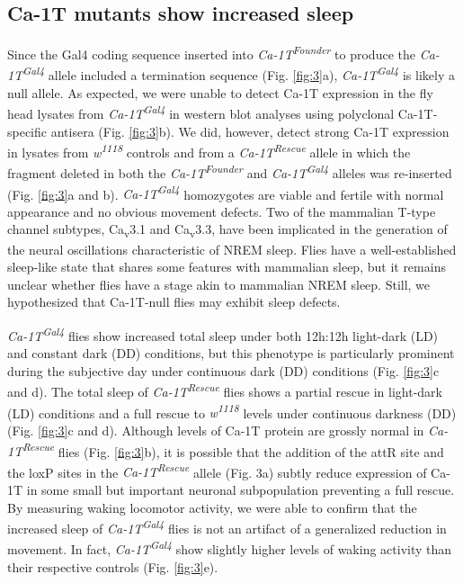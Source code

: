 \subsection*{Ca-\alpha1T mutants show increased sleep}

Since the Gal4 coding sequence inserted into \emph{Ca-\alpha1T\textsuperscript{Founder}} to produce the \emph{Ca-\alpha1T\textsuperscript{Gal4}} allele included a termination sequence (Fig. \ref{fig:3}a), \emph{Ca-\alpha1T\textsuperscript{Gal4}} is likely a null allele.
As expected, we were unable to detect Ca-\alpha1T expression in the fly head lysates from \emph{Ca-\alpha1T\textsuperscript{Gal4}} in western blot analyses using polyclonal Ca-\alpha1T-specific antisera (Fig. \ref{fig:3}b). We did, however, detect strong Ca-\alpha1T expression in lysates from \emph{w\textsuperscript{1118}} controls and from a \emph{Ca-\alpha1T\textsuperscript{Rescue}} allele in which the fragment deleted in both the \emph{Ca-\alpha1T\textsuperscript{Founder}} and \emph{Ca-\alpha1T\textsuperscript{Gal4}} alleles was re-inserted (Fig. \ref{fig:3}a and b).
\emph{Ca-\alpha1T\textsuperscript{Gal4}} homozygotes are viable and fertile with normal appearance and no obvious movement defects.
Two of the mammalian T-type channel subtypes, Ca\textsubscript{v}3.1 and Ca\textsubscript{v}3.3, have been implicated in the generation of the neural oscillations characteristic of NREM sleep\cite{Lee:2004ey,astori:2011aa}.
Flies have a well-established sleep-like state that shares some features with mammalian sleep, but it remains unclear whether flies have a stage akin to mammalian NREM sleep.
Still, we hypothesized that Ca-\alpha1T-null flies may exhibit sleep defects.

\emph{Ca-\alpha1T\textsuperscript{Gal4}} flies show increased total sleep under both 12h:12h light-dark (LD) and constant dark (DD) conditions, but this phenotype is particularly prominent during the subjective day under continuous dark (DD) conditions (Fig. \ref{fig:3}c and d).
The total sleep of \emph{Ca-\alpha1T\textsuperscript{Rescue}} flies shows a partial rescue in light-dark (LD) conditions and a full rescue to \emph{w\textsuperscript{1118}} levels under continuous darkness (DD) (Fig. \ref{fig:3}c and d).
Although levels of Ca-\alpha1T protein are grossly normal in \emph{Ca-\alpha1T\textsuperscript{Rescue}} flies (Fig. \ref{fig:3}b), it is possible that the addition of the attR site and the loxP sites in the \emph{Ca-\alpha1T\textsuperscript{Rescue}} allele (Fig. 3a) subtly reduce expression of Ca-\alpha1T in some small but important neuronal subpopulation preventing a full rescue.
By measuring waking locomotor activity, we were able to confirm that the increased sleep of \emph{Ca-\alpha1T\textsuperscript{Gal4}} flies is not an artifact of a generalized reduction in movement. In fact, \emph{Ca-\alpha1T\textsuperscript{Gal4}} show slightly higher levels of waking activity than their respective controls (Fig. \ref{fig:3}e).

